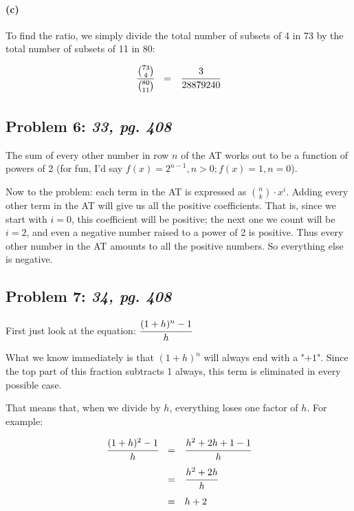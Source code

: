 \documentclass[a4paper]{article}
\begin{document}
\paragraph{(c)} To find the ratio, we simply divide the total number of subsets of 4 in 73 by the total number of subsets of 11 in 80:

\begin{equation}
\begin{array}{rll}
\cfrac{{73 \choose 4}}{{80 \choose 11}} & = & \cfrac{3}{28879240} \\[.15in]
\end{array}
\end{equation}

\subsection*{Problem 6: \textit{33, pg. 408}} The sum of every other number in row $n$ of the AT works out to be a function of powers of 2 (for fun, I'd say $f(x) = 2^{n-1}, n > 0; f(x) = 1, n = 0$).

Now to the problem: each term in the AT is expressed as ${n \choose k} \cdot x^i$. Adding every other term in the AT will give us all the positive coefficients. That is, since we start with $i=0$, this coefficient will be positive; the next one we count will be $i=2$, and even a negative number raised to a power of 2 is positive. Thus every other number in the AT amounts to all the positive numbers. So everything else is negative.

\subsection*{Problem 7: \textit{34, pg. 408}} First just look at the equation: $\cfrac{(1+h)^n -1}{h}$

What we know immediately is that $(1+h)^n$ will always end with a "$+ 1$". Since the top part of this fraction subtracts 1 always, this term is eliminated in every possible case.

That means that, when we divide by $h$, everything loses one factor of $h$. For example:

\begin{equation}
\begin{array}{rll}
\cfrac{(1+h)^2-1}{h} & = & \cfrac{h^2 + 2h + 1 - 1}{h} \\[.15in]
& = & \cfrac{h^2 + 2h}{h} \\[.15in]
& = & h + 2 \\[.15in]
\end{array}
\end{equation}
\end{document}
